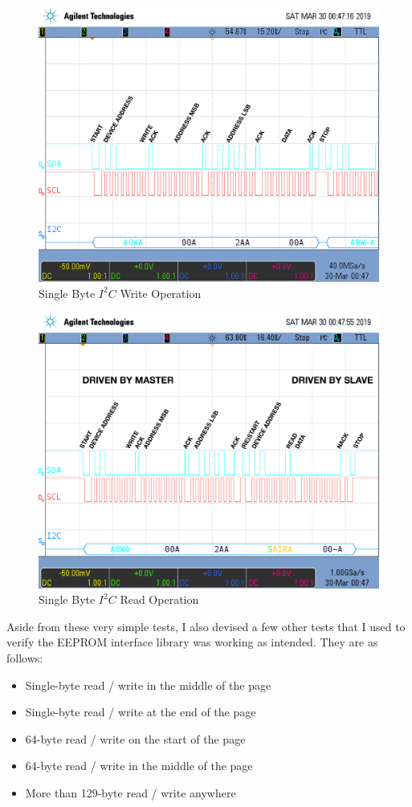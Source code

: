 \documentclass[a4paper, 12pt]{article}
\begin{document}
\begin{figure}[H]
\centering
\includegraphics[width=.8\textwidth]{scope_1-edit.jpg}
\caption{Single Byte $I^2C$ Write Operation}
\label{fig:scope1edit}
\end{figure}

\begin{figure}[H]
\centering
\includegraphics[width=.8\textwidth]{scope_2-edit.jpg}
\caption{Single Byte $I^2C$ Read Operation}
\label{fig:scope2edit}
\end{figure}

Aside from these very simple tests, I also devised a few other tests that I used to verify the EEPROM interface library was working as intended. They are as follows:

\begin{itemize}
\item Single-byte read / write in the middle of the page
\item Single-byte read / write at the end of the page
\item 64-byte read / write on the start of the page
\item 64-byte read / write in the middle of the page
\item More than 129-byte read / write anywhere
\end{itemize}
\end{document}
